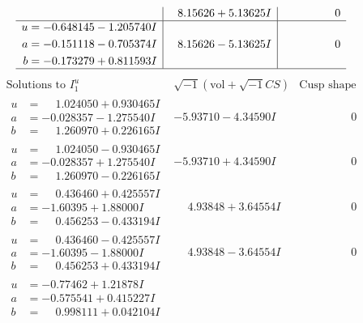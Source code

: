 \documentclass[1p]{elsarticle_modified}
\theoremstyle{definition}
\newcommand{\I}{\sqrt{-1}}
\begin{document}
$$\begin{array}{c|c|c}
 & \phantom{-}8.15626 + 5.13625 I & \phantom{-0.000000 } 0 \\ \hline\begin{aligned}
u &= -0.648145 - 1.205740 I \\
a &= -0.151118 - 0.705374 I \\
b &= -0.173279 + 0.811593 I\end{aligned}
 & \phantom{-}8.15626 - 5.13625 I & \phantom{-0.000000 } 0\\
 \hline 
 \end{array}$$\newpage$$\begin{array}{c|c|c}  
\text{Solutions to }I^u_{1}& \I (\text{vol} + \sqrt{-1}CS) & \text{Cusp shape}\\
 \hline 
\begin{aligned}
u &= \phantom{-}1.024050 + 0.930465 I \\
a &= -0.028357 - 1.275540 I \\
b &= \phantom{-}1.260970 + 0.226165 I\end{aligned}
 & -5.93710 - 4.34590 I & \phantom{-0.000000 } 0 \\ \hline\begin{aligned}
u &= \phantom{-}1.024050 - 0.930465 I \\
a &= -0.028357 + 1.275540 I \\
b &= \phantom{-}1.260970 - 0.226165 I\end{aligned}
 & -5.93710 + 4.34590 I & \phantom{-0.000000 } 0 \\ \hline\begin{aligned}
u &= \phantom{-}0.436460 + 0.425557 I \\
a &= -1.60395 + 1.88000 I \\
b &= \phantom{-}0.456253 - 0.433194 I\end{aligned}
 & \phantom{-}4.93848 + 3.64554 I & \phantom{-0.000000 } 0 \\ \hline\begin{aligned}
u &= \phantom{-}0.436460 - 0.425557 I \\
a &= -1.60395 - 1.88000 I \\
b &= \phantom{-}0.456253 + 0.433194 I\end{aligned}
 & \phantom{-}4.93848 - 3.64554 I & \phantom{-0.000000 } 0 \\ \hline\begin{aligned}
u &= -0.77462 + 1.21878 I \\
a &= -0.575541 + 0.415227 I \\
b &= \phantom{-}0.998111 + 0.042104 I\end{aligned}

\end{array}$$
\end{document}
